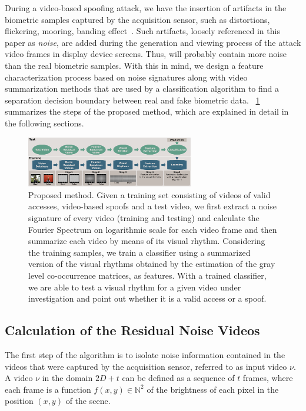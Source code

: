 \documentclass[journal]{IEEEtran}
\providecommand{\rv}[1]{{\protect\color{black}{#1}}}
\providecommand{\rrv}[1]{{\protect\color{black}{#1}}}
\providecommand{\bmark}[1]{{\protect\color{black}{#1}}}
\begin{document}
During a video-based spoofing attack, we have the insertion of artifacts in the biometric samples captured by the acquisition sensor, such as distortions, flickering, mooring, \rv{and} banding effect~\cite{Beach:PP:2008}. Such artifacts, loosely referenced in this paper as \emph{noise}, are added during the generation and viewing process of the attack video frames in display device screens. Thus, \bmark{the biometric sample extracted from an attack video} will probably contain more noise than the real biometric samples. With this in mind, we design a feature characterization process based on noise signatures along with video summarization methods that are used by a classification algorithm to find a separation decision boundary between real and fake biometric data. \rrv{Fig.}~\ref{fig:method} summarizes the steps of the proposed method, which are explained in detail in the following sections.
%
\begin{figure}[!hbt]
\centering
	\includegraphics*[width=0.65\textwidth]{figure-02.png}
\caption{Proposed method. Given a training set consisting of videos of valid accesses, video-based spoofs and a test video, we first extract a noise signature of every video (training and testing) and calculate the Fourier Spectrum on logarithmic scale for each video frame and then summarize each video by means of its visual rhythm. Considering the training samples, we train a classifier using a summarized version of the visual rhythms obtained by the estimation of the gray level co-occurrence matrices, as features. With a trained classifier, we are able to test a visual rhythm for a given video under investigation and point out whether it is a valid access or a spoof.}
\label{fig:method}
\end{figure}

\subsection{Calculation of the Residual Noise Videos}
The first step of the algorithm is to isolate \rv{the} noise information contained in the videos that were captured by the acquisition sensor, \rv{hereinafter} referred to as input video $\nu$. A video $\nu$ in the domain $2D+t$ can be defined as a sequence of $\mathit{t}$ frames, where each frame is a function $f(x,y) \in \mathbb{N}^2$ of the brightness of each pixel in the position $(x,y)$ of the scene. 
\end{document}
